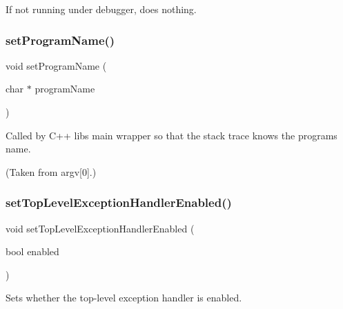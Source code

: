If not running under debugger, does nothing. \mbox{\label{namespacegexceptions_a47c669ec573608d439258c48c202d58a}} 
\subsubsection{\texorpdfstring{set\+Program\+Name()}{setProgramName()}}
{\footnotesize\ttfamily void set\+Program\+Name (\begin{DoxyParamCaption}\item[{char $\ast$}]{program\+Name }\end{DoxyParamCaption})}



Called by C++ lib\textquotesingle{}s main wrapper so that the stack trace knows the program\textquotesingle{}s name. 

(Taken from argv\mbox{[}0\mbox{]}.) \mbox{\label{namespacegexceptions_aecffab3c2119276b44cb55564b11e520}} 
\subsubsection{\texorpdfstring{set\+Top\+Level\+Exception\+Handler\+Enabled()}{setTopLevelExceptionHandlerEnabled()}}
{\footnotesize\ttfamily void set\+Top\+Level\+Exception\+Handler\+Enabled (\begin{DoxyParamCaption}\item[{bool}]{enabled }\end{DoxyParamCaption})}



Sets whether the top-\/level exception handler is enabled. 

